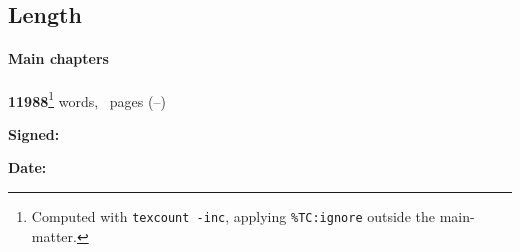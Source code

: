 \ifanonymised
\subsection*{Length}

\paragraph{Main chapters} 
\textbf{11988}\footnote{Computed with \texttt{texcount -inc}, applying \texttt{\%TC:ignore} outside the main-matter.} words, \textbf{\contentpages}~pages
(\pageref{firstcontentpage}--\pageref{lastcontentpage})

\fi

\vfill

\textbf{Signed:} 
\ifanonymised
\candidate
\else
\authorself{}
\fi

\vspace{0.5cm}
\textbf{Date:} \submissiondate{}
\vspace{3cm}

\endgroup
